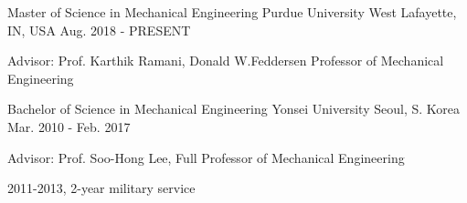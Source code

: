 


\begin{cventries}


    \cventry
    {Master of Science in Mechanical Engineering} %
    {Purdue University} %
    {West Lafayette, IN, USA} %
    {Aug. 2018 - PRESENT} %
    { %
    \begin{cvitems}
        \item {Advisor: Prof. Karthik Ramani, Donald W.Feddersen Professor of Mechanical Engineering}
    \end{cvitems}
    }

    \cventry
    {Bachelor of Science in Mechanical Engineering} %
    {Yonsei University} %
    {Seoul, S. Korea} %
    {Mar. 2010 - Feb. 2017} %
    { %
    \begin{cvitems}
        \item {Advisor: Prof. Soo-Hong Lee, Full Professor of Mechanical Engineering}
        \item {2011-2013, 2-year military service}
    \end{cvitems}
    }

\end{cventries}